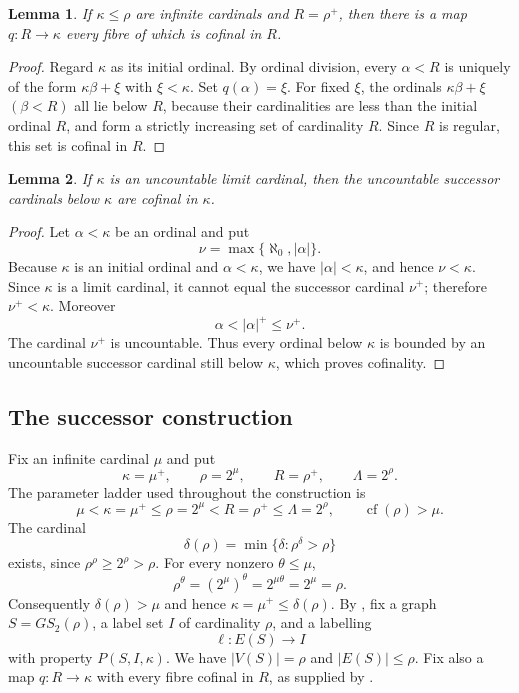 \documentclass[11pt]{amsart}
\newtheorem{lemma}[lemma]{Lemma}
\theoremstyle{definition}
\theoremstyle{remark}
\numberwithin{equation}{section}
\DeclareMathOperator{\cf}{cf}
\begin{document}
\begin{lemma}
\label{lem:cofinal-fibres}
If $\kappa\le\rho$ are infinite cardinals and $R=\rho^+$, then there is
a map $q:R\to\kappa$ every fibre of which is cofinal in $R$.
\end{lemma}

\begin{proof}
Regard $\kappa$ as its initial ordinal.  By ordinal division, every
$\alpha<R$ is uniquely of the form $\kappa\beta+\xi$ with
$\xi<\kappa$.  Set $q(\alpha)=\xi$.  For fixed $\xi$, the ordinals
$\kappa\beta+\xi$ $(\beta<R)$ all lie below $R$, because their
cardinalities are less than the initial ordinal $R$, and form a strictly
increasing set of cardinality $R$.  Since $R$ is regular, this set is
cofinal in $R$.
\end{proof}

\begin{lemma}
\label{lem:successors-cofinal}
If $\kappa$ is an uncountable limit cardinal, then the uncountable
successor cardinals below $\kappa$ are cofinal in $\kappa$.
\end{lemma}

\begin{proof}
Let $\alpha<\kappa$ be an ordinal and put
\[
  \nu=\max\{\aleph_0,|\alpha|\}.
\]
Because $\kappa$ is an initial ordinal and $\alpha<\kappa$, we have
$|\alpha|<\kappa$, and hence $\nu<\kappa$.  Since $\kappa$ is a limit
cardinal, it cannot equal the successor cardinal $\nu^+$; therefore
$\nu^+<\kappa$.  Moreover
\[
  \alpha<|\alpha|^+\le\nu^+.
\]
The cardinal $\nu^+$ is uncountable.  Thus every ordinal below $\kappa$
is bounded by an uncountable successor cardinal still below $\kappa$,
which proves cofinality.
\end{proof}

\subsection{The successor construction}

Fix an infinite cardinal $\mu$ and put
\[
 \kappa=\mu^+,
 \qquad
 \rho=2^\mu,
 \qquad
 R=\rho^+,
 \qquad
 \Lambda=2^\rho.
\]
The parameter ladder used throughout the construction is
\begin{equation}
 \mu<\kappa=\mu^+\le\rho=2^\mu<R=\rho^+\le\Lambda=2^\rho,
 \qquad \cf(\rho)>\mu.
 \label{eq:parameter-ladder}
\end{equation}
The cardinal
\[
 \delta(\rho)=\min\{\delta:\rho^\delta>\rho\}
\]
exists, since $\rho^\rho\ge2^\rho>\rho$.  For every nonzero
$\theta\le\mu$,
\[
 \rho^\theta=(2^\mu)^\theta=2^{\mu\theta}=2^\mu=\rho.
\]
Consequently $\delta(\rho)>\mu$ and hence
$\kappa=\mu^+\le\delta(\rho)$.  By
, fix a graph
$S=GS_2(\rho)$, a label set $I$ of cardinality $\rho$, and a labelling
\[
 \ell:E(S)\longrightarrow I
\]
with property $P(S,I,\kappa)$.  We have
$|V(S)|=\rho$ and $|E(S)|\le\rho$.  Fix also a map
$q:R\to\kappa$ with every fibre cofinal in $R$, as supplied by
.
\end{document}
